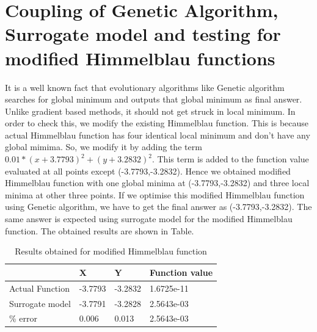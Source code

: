 \section{Coupling of Genetic Algorithm, Surrogate model and testing for modified Himmelblau functions}
\label{Modified Himmelblau function}
It is a well known fact that evolutionary algorithms like Genetic algorithm searches for global minimum and outputs that global minimum as final answer. Unlike gradient based methods, it should not get struck in local minimum. In order to check this, we modify the existing Himmelblau function. This is because actual Himmelblau function has four identical local minimum and don't have any global mimima. So, we modify it by adding the term $  0.01* (x + 3.7793)^2 + (y + 3.2832)^2 $. This term is added to the function value evaluated at all points except (-3.7793,-3.2832). Hence we obtained modified Himmelblau function with one global minima at (-3.7793,-3.2832) and three local minima at other three points. If we optimise this modified Himmelblau function using Genetic algorithm, we have to get the final answer as (-3.7793,-3.2832). The same answer is expected using surrogate model for the modified Himmelblau function. The obtained results are shown in Table.

\begin{table}[H]
	\centering
	\caption{Results obtained for modified Himmelblau function}
	\label{Results obtained for modified Himmelblau function}
	\begin{tabular}{llll}
		\hline \hline
		& X & Y & Function value \\ \hline
		Actual Function & -3.7793 &-3.2832 &1.6725e-11 \\
		Surrogate model & -3.7791 &-3.2828 & 2.5643e-03 \\ \hline
		\% error & 0.006 & 0.013 & 2.5643e-03 \\
		\hline \hline
		
	\end{tabular}
\end{table}








